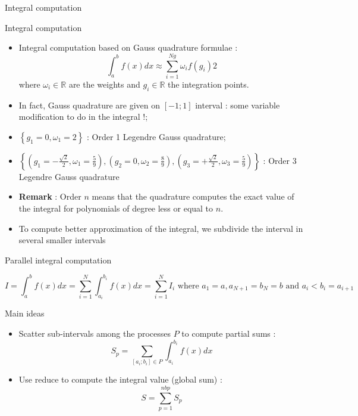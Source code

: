 \documentclass[compress,10pt,aspectratio=169]{beamer}
\begin{document}
\begin{frame}[fragile]{Integral computation}
  \scriptsize
  \begin{block}{\small Integral computation}
    \begin{itemize}
    \item Integral computation based on Gauss quadrature formulae :
      \[
      \int_{a}^{b}f(x)dx \approx \sum_{i=1}^{Ng} \omega_{i}f(g_{i})
2      \]
      where $\omega_{i}\in\mathbb{R}$ are the weights  and $g_{i}\in\mathbb{R}$ the integration points.
    \item In fact, Gauss quadrature are given on $[-1;1]$ interval : some variable modification to do in the integral !;
    \item $\left\{ g_{1}=0, \omega_{1}=2 \right\}$ : Order 1 Legendre Gauss quadrature;
    \item $\left\{ \left( g_{1}=-\frac{\sqrt{2}}{2}, \omega_{1}=\frac{5}{9} \right), \left( g_{2}=0, \omega_{2}=\frac{8}{9} \right), \left( g_{3}=+\frac{\sqrt{2}}{2}, \omega_{3}=\frac{5}{9} \right) \right\}$ : Order 3 Legendre Gauss quadrature
    \item \textbf{Remark} : Order $n$ means that the quadrature computes the exact value of the integral for polynomials of degree less or equal to $n$.
    \item To compute better approximation of the integral, we subdivide the interval in several smaller intervals
    \end{itemize}
  \end{block}
\end{frame}

\begin{frame}[fragile]{Parallel integral computation}
  \scriptsize
  \begin{center}
    \[
    I = \int_{a}^{b}f(x)dx = \sum_{i=1}^{N}\int_{a_{i}}^{b_{i}}f(x)dx = \sum_{i=1}^{N} I_{i} \mbox{ where } a_{1}=a, a_{N+1}= b_{N} = b\mbox{ and } a_{i} < b_{i} = a_{i+1}
    \]
  \end{center}
  \begin{block}{\small Main ideas}
    \begin{itemize}
  \item Scatter sub-intervals among the processes $P$ to compute partial sums :
    \[
    S_{p} = \sum_{[a_{i};b_{i}] \in P} \int_{a_{i}}^{b_{i}} f(x)dx
    \]
  \item Use reduce to compute the integral value (global sum) :
    \[ S = \sum_{p=1}^{nbp} S_{p} \]
    \end{itemize}
  \end{block}
\end{frame}
\end{document}
